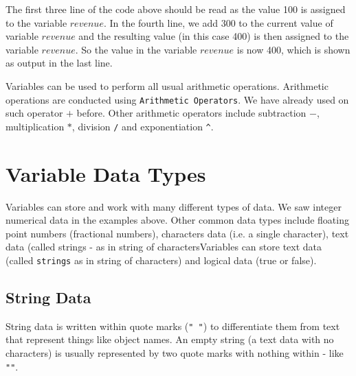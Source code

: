 \documentclass[10pt, letterpaper, twoside]{memoir}\usepackage{knitr}
\begin{document}
The first three line of the code above should be read as the value 100 is assigned to the variable $revenue$. In the fourth line, we add 300 to the current value of variable $revenue$ and the resulting value (in this case 400) is then assigned to the variable $revenue$. So the value in the variable $revenue$ is now 400, which is shown as output in the last line.

Variables can be used to perform all usual arithmetic operations. Arithmetic operations are conducted using \verb|Arithmetic Operators|. We have already used on such operator $+$ before. Other arithmetic operators include subtraction $-$, multiplication $*$, division \verb|/| and exponentiation \verb|^|.

\section{Variable Data Types}

Variables can store and work with many different types of data. We saw integer numerical data in the examples above. Other common data types include floating point numbers (fractional numbers), characters data (i.e. a single character), text data (called strings - as in string of charactersVariables can store text data (called \texttt{strings} as in string of characters) and logical data (true or false).

\subsection{String Data}

String data is written within quote marks (\texttt{" "}) to differentiate them from text that represent things like object names. An empty string (a text data with no characters) is usually represented by two quote marks with nothing within - like \texttt{""}.

\begin{knitrout}
\color{fgcolor}\begin{kframe}
\begin{alltt}
 \hlkwb{<-}   
 \hlkwb{<-}   
\end{alltt}
\end{kframe}
\end{knitrout}
\end{document}
